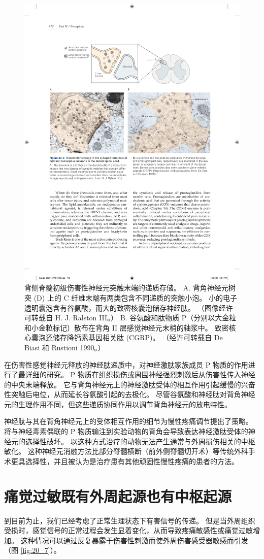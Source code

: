 \begin{figure}[htbp]
	\centering
	\includegraphics[width=0.7\linewidth]{chap20/fig_20_6}
	\caption{背侧脊髓初级伤害性神经元突触末端的递质存储。 
		A. 背角神经元树突 (D) 上的 C 纤维末端有两类包含不同递质的突触小泡。 
		小的电子透明囊泡含有谷氨酸，而大的致密核囊泡储存神经肽。 （图像经许可转载自 H. J. Ralston III。）
		B. 谷氨酸和肽物质 P（分别以大金粒和小金粒标记）散布在背角 II 层感觉神经元末梢的轴浆中。 
		致密核心囊泡还储存降钙素基因相关肽 (CGRP)。 （经许可转载自 De Biasi 和 Rustioni 1990。）}
	\label{fig:20_6}
\end{figure}


在伤害性感觉神经元释放的神经肽递质中，对神经激肽家族成员 P 物质的作用进行了最详细的研究。 
P 物质在组织损伤或周围神经强烈刺激后从伤害性传入神经的中央末端释放。 
它与背角神经元上的神经激肽受体的相互作用引起缓慢的兴奋性突触后电位，从而延长谷氨酸引起的去极化。 
尽管谷氨酸和神经肽对背角神经元的生理作用不同，但这些递质协同作用以调节背角神经元的放电特性。


神经肽与其在背角神经元上的受体相互作用的细节为慢性疼痛调节提出了策略。 
将与神经毒素偶联的 P 物质输注到实验动物的背角会导致表达神经激肽受体的神经元的选择性破坏。 
以这种方式治疗的动物无法产生通常与外周损伤相关的中枢敏化。 
这种神经元消融方法比部分脊髓横断（前外侧脊髓切开术）等传统外科手术更具选择性，并且被认为是治疗患有其他顽固性慢性疼痛的患者的方法。



\section{痛觉过敏既有外周起源也有中枢起源}
到目前为止，我们已经考虑了正常生理状态下有害信号的传递。 
但是当外周组织受损时，感觉信号的正常过程会发生显着变化，从而导致疼痛敏感性或痛觉过敏增加。 
这种情况可以通过反复暴露于伤害性刺激而使外周伤害感受器敏感而引发（图 \ref{fig:20_7}）。


